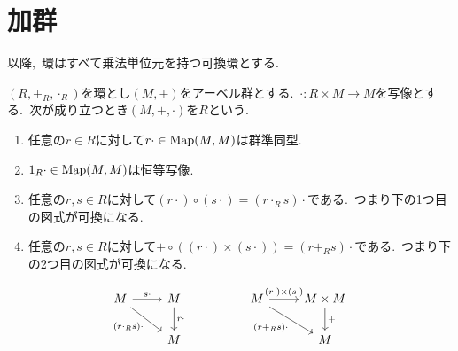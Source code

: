 
\section{加群}
\begin{remark}
以降,\ 環はすべて乗法単位元を持つ可換環とする.
\end{remark}

\begin{definition} \label{def: Module}
$(R, +_R, \cdot_R)$を環とし$(M, +)$をアーベル群とする.\
$\cdot \colon R \times M \to M$を写像とする.\
次が成り立つとき$(M, +, \cdot)$を$R$という.
\def\labelenumi{(\theenumi)\hspace{.5\zw}}
\begin{enumerate}
    \item 任意の$r \in R$に対して$r \cdot \in \operatorname{Map}(M,M)$は群準同型.
    \item $1_R \cdot \in \operatorname{Map}(M,M)$は恒等写像.
    \item 任意の$r, s \in R$に対して$(r \cdot) \circ (s \cdot) = (r \cdot_R s) \cdot$である.\
    つまり下の1つ目の図式が可換になる.
    \item 任意の$r, s \in R$に対して$+ \circ ((r \cdot) \times (s \cdot)) = (r +_R s) \cdot$である.\
    つまり下の2つ目の図式が可換になる.
\end{enumerate}
\[\begin{tikzcd}
	M & M && M & {M \times M} \\
	& M &&& M
	\arrow["{s\cdot}", from=1-1, to=1-2]
	\arrow["{(r \cdot_R s) \cdot}"', from=1-1, to=2-2]
	\arrow["{r\cdot}", from=1-2, to=2-2]
	\arrow["{(r\cdot)\times(s\cdot)}", from=1-4, to=1-5]
	\arrow["{(r +_R s)\cdot}"', from=1-4, to=2-5]
	\arrow["{+}", from=1-5, to=2-5]
\end{tikzcd}\]
\end{definition}

